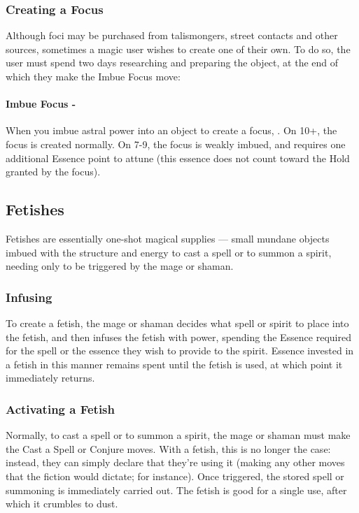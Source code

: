 \subsubsection{Creating a Focus}
Although foci may be purchased from talismongers, street contacts and other sources, sometimes a magic user wishes to create one of their own. To do so, the user must spend two days researching and preparing the object, at the end of which they make the Imbue Focus move:

\paragraph{Imbue Focus -} When you imbue astral power into an object to create a focus, . On 10+, the focus is created normally. On 7-9, the focus is weakly imbued, and requires one additional Essence point to attune (this essence does not count toward the Hold granted by the focus).


\subsection{Fetishes}

Fetishes are essentially one-shot magical supplies — small mundane objects imbued with the structure and energy to cast a spell or to summon a spirit, needing only to be triggered by the mage or shaman.

\subsubsection{Infusing}
To create a fetish, the mage or shaman decides what spell or spirit to place into the fetish, and then infuses the fetish with power, spending the Essence required for the spell or the essence they wish to provide to the spirit. Essence invested in a fetish in this manner remains spent until the fetish is used, at which point it immediately returns.

\subsubsection{Activating a Fetish}
Normally, to cast a spell or to summon a spirit, the mage or shaman must make the Cast a Spell or Conjure moves. With a fetish, this is no longer the case: instead, they can simply declare that they’re using it (making any other moves that the fiction would dictate;  for instance). Once triggered, the stored spell or summoning is immediately carried out. The fetish is good for a single use, after which it crumbles to dust.
